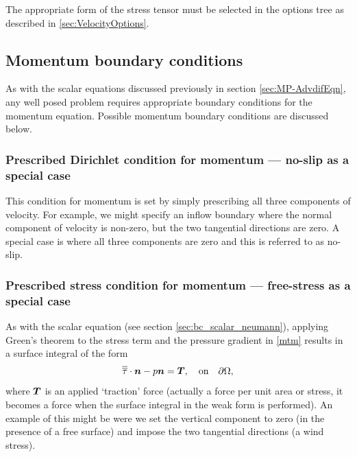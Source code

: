 The appropriate form of the stress tensor must be selected in the options tree as described in \ref{sec:VelocityOptions}.

\subsection{Momentum boundary conditions} \label{sec:BCs-mom}


As with the scalar equations discussed previously in section \ref{sec:MP-AdvdifEqn}, any well posed problem requires appropriate boundary conditions for the momentum equation. Possible momentum boundary conditions are discussed below.

\subsubsection{Prescribed Dirichlet condition for momentum --- no-slip as a special case}\label{sec:bc_vector_dirichlet}

This condition for momentum is set by simply prescribing all three components of
velocity. For example, we might specify an inflow boundary where the normal component
of velocity is non-zero, but the two tangential directions are zero. A special case is
where all three components are zero and this is referred to as no-slip.

\subsubsection{Prescribed stress condition for momentum --- free-stress as a special case}\label{sec:bc_vector_stress}

As with the scalar equation (see section \ref{sec:bc_scalar_neumann}), applying Green's theorem to the stress term and the pressure
gradient in \eqref{mtm} results in a surface integral of the form
\begin{equation}\label{StressBC}
\overline{\overline{\tau}}\cdot{\mbox{\boldmath$n$}} - p{\mbox{\boldmath$n$}} = {\mbox{\boldmath$T$}},\quad \textrm{on}\quad \partial\Omega,
\end{equation}
where ${\mbox{\boldmath$T$}}$ is an applied `traction' force (actually a force per unit area or stress, it becomes
a force when the surface integral in the weak form is performed). An example of this might be were we set the vertical
component to zero (in the presence of a free surface) and impose the two tangential directions
(\eg a wind stress).

